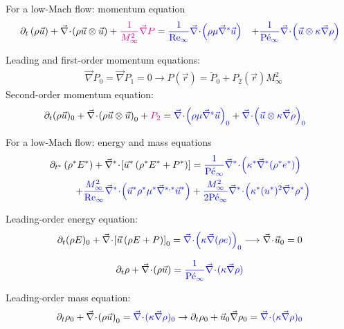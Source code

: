 \documentclass[xcolor=dvipsnames,10pt]{beamer}
\renewcommand{\Re}{\textrm{Re}}
\newcommand{\Pe}{\textrm{P\'e}}
\renewcommand{\div}{\vec{\nabla}\! \cdot \!}
\newcommand{\grad}{\vec{\nabla}}
\newcommand{\divv}[1]{\vec{\nabla}^{#1}\! \cdot \!}
\newcommand{\gradd}[1]{\vec{\nabla}^{#1}}
\begin{document}
\begin{frame}{For a low-Mach flow: momentum equation}
\begin{align}
\partial_{t} \left( \rho \vec{u} \right) 
+ \div \left( \rho \vec{u}\otimes \vec{u} \right) 
+ \textcolor{magenta}{\frac{1}{M_\infty^2}\grad  P}
&= 
\textcolor{blue}{\frac{1}{\Re_\infty} \div \left( \rho \mu \gradd{s} \vec{u} \right)}
&+
\textcolor{blue}{\frac{1}{\Pe_\infty} \div \left(\vec{u}\otimes \kappa \grad  \rho \right)} \nonumber
\end{align}
\begin{block}{}
Leading and first-order momentum equations:
\begin{align}
&\grad P_0 = \grad P_1 = 0 \longrightarrow P(\vec{r}) = \tilde{P}_0 + P_2(\vec{r}) M_\infty^2\nonumber 
\end{align}
Second-order momentum equation:
\begin{align}
&\partial_t (\rho \vec{u} )_0 + \div \left( \rho \vec{u}\otimes \vec{u} \right)_0 + \textcolor{magenta}{P_2} = \textcolor{blue}{ \div \left( \rho \mu \gradd{s} \vec{u} \right)_0}
+
\textcolor{blue}{ \div \left(\vec{u}\otimes \kappa \grad  \rho \right)_0} \nonumber
\end{align}
\end{block}
\end{frame}
\begin{frame}{For a low-Mach flow: energy and mass equations}
\begin{align}
\partial_{t^*} \left( \rho^* E^* \right) 
+ \divv{*}  \left[ \vec{u}^* \left( \rho^* E^* + P^* \right) \right] 
&=
\textcolor{blue}{\frac{1}{\Pe_\infty} \divv{*}  \left( \kappa^*  \gradd{*} (\rho^* e^*) \right)} \nonumber \\
+
\textcolor{blue}{\frac{M_\infty^2}{\Re_\infty} \divv{*}  \left( \vec{u}^* \rho^* \mu^* \gradd{s,*} \vec{u}^* \right)}
&+ 
\textcolor{blue}{\frac{M_\infty^2}{2 \Pe_\infty} \divv{*}  \left(\kappa^* (u^*)^2 \gradd{*} \rho^* \right)} \nonumber
\end{align}
\begin{block}{}
Leading-order energy equation:
\begin{align}
\partial_t ( \rho E )_0 + \div \left[ \vec{u} \left( \rho E + P \right) \right]_0 = \textcolor{blue}{\div \left( \kappa  \grad (\rho e) \right)_0} \longrightarrow \div \vec{u}_0 = 0 \nonumber 
\end{align}
\end{block}
\begin{align}
\partial_{t} \rho+ \div  \left(  \rho \vec{u}  \right) = \textcolor{blue}{\frac{1}{\Pe_\infty} \div  ( \kappa \grad \rho )} \nonumber
\end{align}
\begin{block}{}
Leading-order mass equation:
\begin{align}
\partial_{t} \rho_0+ \div  \left(  \rho \vec{u}  \right)_0 = \textcolor{blue}{ \div ( \kappa \grad \rho )_0} \to \partial_t \rho_0 + \vec{u}_0 \grad \rho_0 = \textcolor{blue}{ \div ( \kappa \grad \rho )_0}\nonumber
\end{align}
\end{block}
\end{frame}
\end{document}
